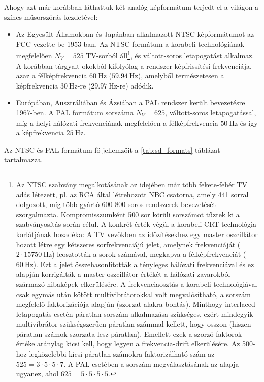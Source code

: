 Ahogy azt már korábban láthattuk két analóg képformátum terjedt el a világon a színes műsorszórás kezdetével:
\begin{itemize}
\item Az Egyesült Államokban és Japánban alkalmazott NTSC képformátumot az FCC vezette be 1953-ban.
Az NTSC formátum a korabeli technológiának megfelelően $N_V = 525$ TV-sorból áll\footnote{
Az NTSC szabvány megalkotásának az idejében már több fekete-fehér TV adás létezett, pl. az RCA által létrehozott NBC csatorna, amely 441 sorral dolgozott, míg több gyártó 600-800 soros rendszerek bevezetését szorgalmazta.
Kompromisszumként 500 sor körüli sorszámot tűztek ki a szabványosítás során célul.
A konkrét érték végül a korabeli CRT technológia korlátjának hozadéka:
A TV vevőkben az időzítésekhez egy master oszcillátor hozott létre egy kétszeres sorfrekvenciájú jelet, amelynek frekvenciáját ($2\cdot 15750~\mathrm{Hz}$) leosztották a sorok számával, megkapva a félképfrekvenciát ($60~\mathrm{Hz}$).
Ezt a jelet összehasonlították a tényleges hálózati frekvenciával és ez alapján korrigálták a master oszcillátor értékét a hálózati zavarokból származó hibaképek elkerülésére.
A frekvenciaosztás a korabeli technológiával csak egymás után kötött multivibrátorokkal volt megvalósítható, a sorszám megfelelő faktorizációja alapján (szorzat alakra bontás).
Minthogy interlaced letapogatás esetén páratlan sorszám alkalmazása szükséges, ezért mindegyik multivibrátor szükségszerűen páratlan számmal kellett, hogy osszon (hiszen páratlan számok szorzata lesz páratlan).
Emellett ezek a szorzó-faktorok értéke aránylag kicsi kell, hogy legyen a frekvencia-drift elkerülésére.
Az 500-hoz legközelebbi kicsi páratlan számokra faktorizálható szám az $525 = 3\cdot 5\cdot 5 \cdot 7$.
A PAL esetében a sorszám megválasztásának az alapja ugyanez, ahol $625 = 5\cdot 5\cdot 5 \cdot 5$.
}, és váltott-soros letapogatást alkalmaz.
A korábban tárgyalt okokból kifolyólag a rendszer képfrissítési frekvenciája, azaz a félképfrekvencia $60~\mathrm{Hz}$ ($59.94~\mathrm{Hz}$), amelyből természetesen a képfrekvencia $30~\mathrm{Hz}$-re ($29.97~\mathrm{Hz}$-re) adódik.
\item Európában, Ausztráliában és Ázsiában a PAL rendszer került bevezetésre 1967-ben.
A PAL formátum sorszáma $N_V = 625$, váltott-soros letapogatással, míg a helyi hálózati frekvenciának megfelelően a félképfrekvencia $50~\mathrm{Hz}$ és így a képfrekvencia $25~\mathrm{Hz}$.
\end{itemize}
Az NTSC és PAL formátum fő jellemzőit a \ref{tab:sd_formats} táblázat tartalmazza.
